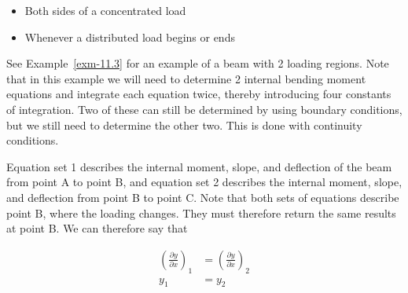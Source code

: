 \documentclass[
  letterpaper,
  DIV=11,
  numbers=noendperiod]{scrreprt}
\theoremstyle{definition}
\theoremstyle{remark}
\begin{document}
\begin{itemize}
\item
  Both sides of a concentrated load
\item
  Whenever a distributed load begins or ends
\end{itemize}

See Example~\ref{exm-11.3} for an example of a beam with 2 loading
regions. Note that in this example we will need to determine 2 internal
bending moment equations and integrate each equation twice, thereby
introducing four constants of integration. Two of these can still be
determined by using boundary conditions, but we still need to determine
the other two. This is done with continuity conditions.

Equation set 1 describes the internal moment, slope, and deflection of
the beam from point A to point B, and equation set 2 describes the
internal moment, slope, and deflection from point B to point C. Note
that both sets of equations describe point B, where the loading changes.
They must therefore return the same results at point B. We can therefore
say that

\[
\begin{aligned}
\left(\frac{\partial y}{\partial x}\right)_{1} & =\left(\frac{\partial y}{\partial x}\right)_{2} \\
y_{1} & =y_{2}
\end{aligned}
\]
\end{document}
